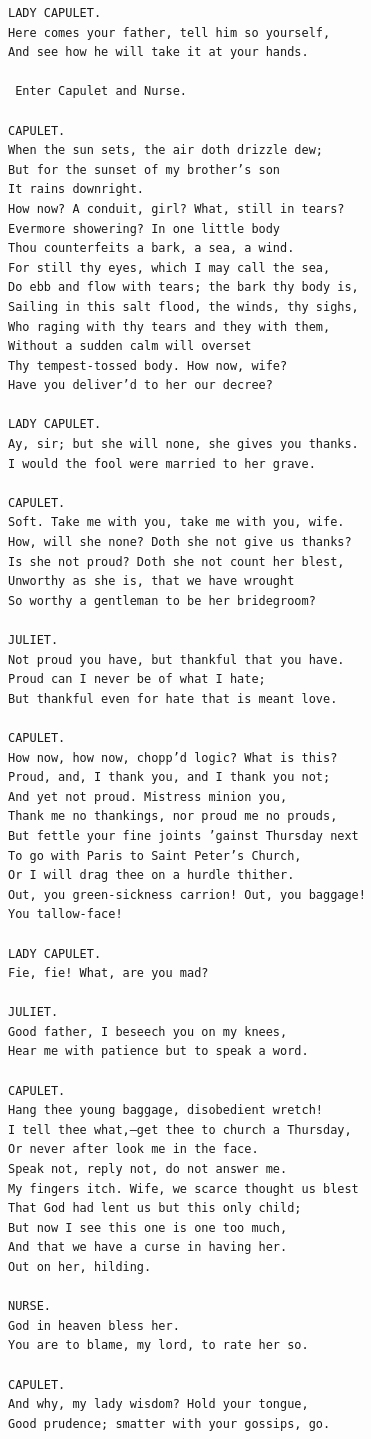 \documentclass{article}
\begin{document}
\begin{verbatim}
LADY CAPULET.
Here comes your father, tell him so yourself,
And see how he will take it at your hands.

 Enter Capulet and Nurse.

CAPULET.
When the sun sets, the air doth drizzle dew;
But for the sunset of my brother’s son
It rains downright.
How now? A conduit, girl? What, still in tears?
Evermore showering? In one little body
Thou counterfeits a bark, a sea, a wind.
For still thy eyes, which I may call the sea,
Do ebb and flow with tears; the bark thy body is,
Sailing in this salt flood, the winds, thy sighs,
Who raging with thy tears and they with them,
Without a sudden calm will overset
Thy tempest-tossed body. How now, wife?
Have you deliver’d to her our decree?

LADY CAPULET.
Ay, sir; but she will none, she gives you thanks.
I would the fool were married to her grave.

CAPULET.
Soft. Take me with you, take me with you, wife.
How, will she none? Doth she not give us thanks?
Is she not proud? Doth she not count her blest,
Unworthy as she is, that we have wrought
So worthy a gentleman to be her bridegroom?

JULIET.
Not proud you have, but thankful that you have.
Proud can I never be of what I hate;
But thankful even for hate that is meant love.

CAPULET.
How now, how now, chopp’d logic? What is this?
Proud, and, I thank you, and I thank you not;
And yet not proud. Mistress minion you,
Thank me no thankings, nor proud me no prouds,
But fettle your fine joints ’gainst Thursday next
To go with Paris to Saint Peter’s Church,
Or I will drag thee on a hurdle thither.
Out, you green-sickness carrion! Out, you baggage!
You tallow-face!

LADY CAPULET.
Fie, fie! What, are you mad?

JULIET.
Good father, I beseech you on my knees,
Hear me with patience but to speak a word.

CAPULET.
Hang thee young baggage, disobedient wretch!
I tell thee what,—get thee to church a Thursday,
Or never after look me in the face.
Speak not, reply not, do not answer me.
My fingers itch. Wife, we scarce thought us blest
That God had lent us but this only child;
But now I see this one is one too much,
And that we have a curse in having her.
Out on her, hilding.

NURSE.
God in heaven bless her.
You are to blame, my lord, to rate her so.

CAPULET.
And why, my lady wisdom? Hold your tongue,
Good prudence; smatter with your gossips, go.


\end{verbatim}
\end{document}
